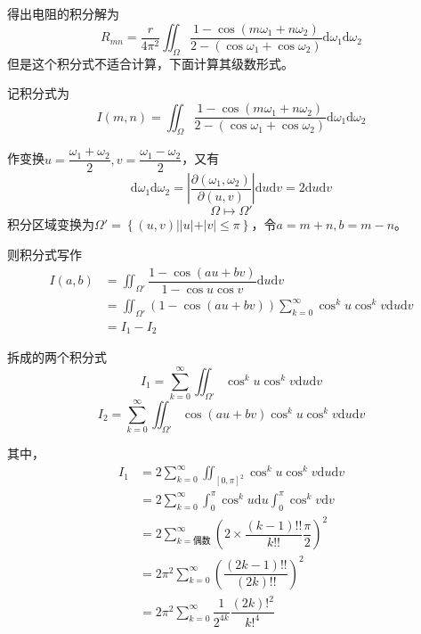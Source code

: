 \documentclass[twocolumn]{article} %
\newcommand{\di}{\mathrm{d}}
\begin{document}
得出电阻的积分解为
\begin{equation}
  R_{mn}=\dfrac{r}{4\pi^2}\iint_{\Omega}\dfrac{1-\cos{(m\omega_1+n\omega_2)}}{2-(\cos\omega_1+\cos\omega_2)}\di\omega_1\di\omega_2
\end{equation}
但是这个积分式不适合计算，下面计算其级数形式。

记积分式为
\begin{equation}
  I(m,n)=\iint_{\Omega}\dfrac{1-\cos{(m\omega_1+n\omega_2)}}{2-(\cos\omega_1+\cos\omega_2)}\di\omega_1\di\omega_2
\end{equation}

作变换$u=\dfrac{\omega_1+\omega_2}{2},v=\dfrac{\omega_1-\omega_2}{2}$，又有
\begin{equation}
  \di\omega_1\di\omega_2=\left|\dfrac{\partial(\omega_1,\omega_2)}{\partial(u,v)}\right|\di u\di v=2\di u\di v
\end{equation}
\begin{equation}
  \Omega\mapsto\Omega'
\end{equation}
积分区域变换为$\Omega'=\left\{(u,v)||u|+|v|\leqslant\pi\right\}$，令$a=m+n,b=m-n$。


则积分式写作
\begin{align*}
  I(a,b)&=\iint_{\Omega'}\dfrac{1-\cos{(au+bv)}}{1-\cos u\cos v}\di u\di v\\
  &=\iint_{\Omega'}(1-\cos{(au+bv)})\sum_{k=0}^{\infty}\cos^ku\cos^kv\di u\di v\\
  &=I_1-I_2
\end{align*}

拆成的两个积分式
\begin{equation}
  I_1=\sum_{k=0}^{\infty}\iint_{\Omega'}\cos^ku\cos^kv\di u\di v
\end{equation}
\begin{equation}
  I_2=\sum_{k=0}^{\infty}\iint_{\Omega'}\cos(au+bv)\cos^ku\cos^kv\di u\di v
\end{equation}

其中，
\begin{align*}
  I_1&=2\sum_{k=0}^{\infty}\iint_{[0,\pi]^2}\cos^ku\cos^kv\di u\di v\\
  &=2\sum_{k=0}^{\infty}\int_0^{\pi}\cos^ku\di u\int_0^{\pi}\cos^kv\di v\\
  &=2\sum_{k=\text{偶数}}^{\infty}\left(2\times\dfrac{(k-1)!!}{k!!}\dfrac{\pi}{2}\right)^2\\
  &=2\pi^2\sum_{k=0}^{\infty}\left(\dfrac{(2k-1)!!}{(2k)!!}\right)^2\\
  &=2\pi^2\sum_{k=0}^{\infty}\dfrac{1}{2^{4k}}\dfrac{(2k)!^2}{k!^4}
\end{align*}
\end{document}
